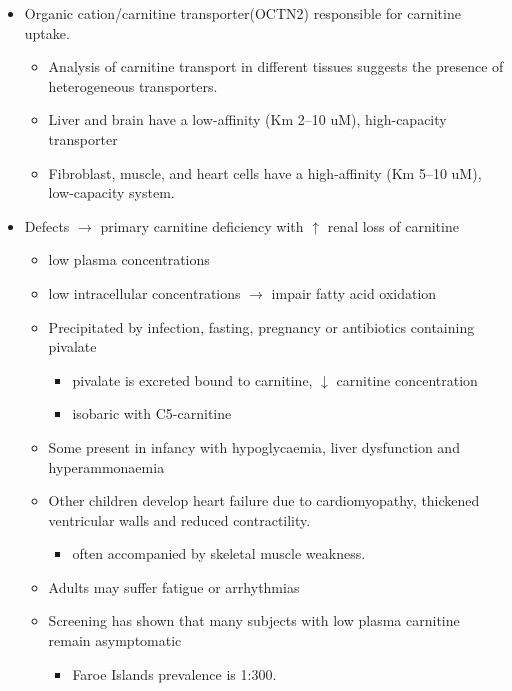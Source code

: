 \documentclass{scrartcl}
\begin{document}
\begin{itemize}
\item Organic cation/carnitine transporter(OCTN2) responsible for
carnitine uptake. 
\begin{itemize}
\item Analysis of carnitine transport in different tissues suggests the
presence of heterogeneous transporters.
\item Liver and brain have a low-affinity (Km 2–10 uM), high-capacity transporter
\item Fibroblast, muscle, and heart cells have a high-affinity (Km 5–10 uM), low-capacity system.
\end{itemize}
\item Defects \(\to\) primary carnitine deficiency with \(\uparrow\) renal loss of carnitine
\begin{itemize}
\item low plasma concentrations
\item low intracellular concentrations \(\to\) impair fatty acid oxidation
\end{itemize}
\begin{itemize}
\item Precipitated by infection, fasting, pregnancy or antibiotics containing pivalate
\begin{itemize}
\item pivalate is excreted bound to carnitine, \(\downarrow\) carnitine concentration
\item isobaric with C5-carnitine
\end{itemize}
\item Some present in infancy with hypoglycaemia, liver dysfunction and hyperammonaemia
\item Other children develop heart failure due to cardiomyopathy,
thickened ventricular walls and reduced contractility.
\begin{itemize}
\item often accompanied by skeletal muscle weakness.
\end{itemize}
\item Adults may suffer fatigue or arrhythmias
\item Screening has shown that many subjects with low plasma carnitine remain asymptomatic
\begin{itemize}
\item Faroe Islands prevalence is 1:300.
\end{itemize}
\end{itemize}
\end{itemize}
\end{document}
